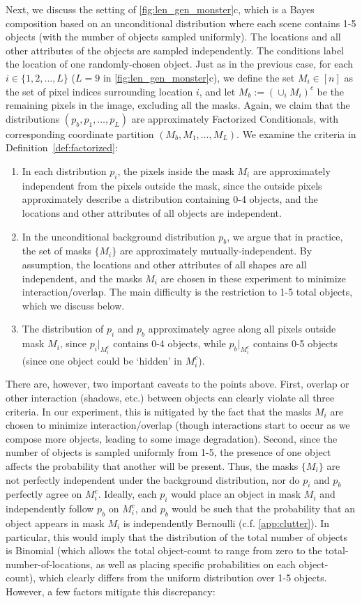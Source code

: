 Next, we discuss the setting of \cref{fig:len_gen_monster}c, which is a Bayes composition based on an unconditional distribution where each scene contains 1-5 objects (with the number of objects sampled uniformly). The locations and all other attributes of the objects are sampled independently. The conditions label the location of one randomly-chosen object. Just as in the previous case, for each $i \in \{1,2, \ldots, L\}$ ($L=9$ in \cref{fig:len_gen_monster}c), we define the set $M_i \in [n]$  as the set of pixel indices surrounding location $i$, and let $M_b := (\cup_i M_i)^c$ be the remaining pixels in the image, excluding all the masks. Again, we claim that the distributions $(p_b, p_1, \ldots, p_L)$
are approximately Factorized Conditionals, with corresponding
coordinate partition $(M_b, M_1,\ldots, M_L)$. We examine the criteria in Definition~\ref{def:factorized}:
\begin{enumerate}
    \setlength{\itemsep}{1pt}
    \item In each distribution $p_i$, the pixels inside the
    mask $M_i$ are approximately independent from the pixels outside the mask,
    since the outside pixels approximately describe a distribution containing 0-4 objects, and the locations and other attributes of all objects are independent.
    \item In the unconditional background distribution $p_b$, we argue that in practice, the set of masks $\{M_i\}$ are approximately
    mutually-independent. By assumption, the locations and other attributes of all shapes are all independent, and the masks $M_i$ are chosen in these experiment to minimize interaction/overlap. The main difficulty is the restriction to 1-5 total objects, which we discuss below.
    \item The distribution of $p_i$ and $p_b$ approximately agree 
    along all pixels outside mask $M_i$, since $p_i|_{M_i^c}$ contains 0-4 objects, while $p_b|_{M_i^c}$ contains 0-5 objects (since one object could be `hidden' in ${M_i^c}$).
\end{enumerate}
There are, however, two important caveats to the points above. First, overlap or other interaction (shadows, etc.) between objects can clearly violate all three criteria. In our experiment, this is mitigated by the fact that the masks $M_i$ are chosen to minimize interaction/overlap (though interactions start to occur as we compose more objects, leading to some image degradation). Second, since the number of objects is sampled uniformly from 1-5, the presence of one object affects the probability that another will be present. Thus, the masks $\{M_i\}$ are not perfectly independent under the background distribution, nor do $p_i$ and $p_b$ perfectly agree on $M_i^c$. Ideally, each $p_i$ would place an object in mask $M_i$ and independently follow $p_b$ on $M_i^c$, and $p_b$ would be such that the probability that an object appears in mask $M_i$ is independently Bernoulli (c.f. \cref{app:clutter}). In particular, this would imply that the distribution of the total number of objects is Binomial (which allows the total object-count to range from zero to the total-number-of-locations, as well as placing specific probabilities on each object-count), which clearly differs from the uniform distribution over 1-5 objects. However, a few factors mitigate this discrepancy:
